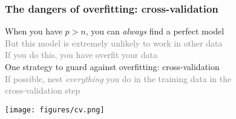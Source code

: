 \documentclass{beamer}
\newcommand{\si}[1]{\hspace{.5cm} \textcolor{gray} {#1}\\}
\newcommand{\sicont}[1]{\hspace{1cm} \textcolor{gray} {#1}\\}
\begin{document}
{%
%

\begin{frame}[t]
\frametitle{The dangers of overfitting: cross-validation}
When you have $p>n$, you can \emph{always} find a perfect model\\
\si{But this model is extremely unlikely to work in other data}
\si{If you do this, you have overfit your data}
\vspace{.2cm}
One strategy to guard against overfitting: cross-validation\\
\si{If possible, nest \emph{everything} you do in the training data in the}
\sicont{cross-validation step}
\begin{center}
\texttt{[image: figures/cv.png]}
\end{center}
\end{frame}

}
\end{document}
